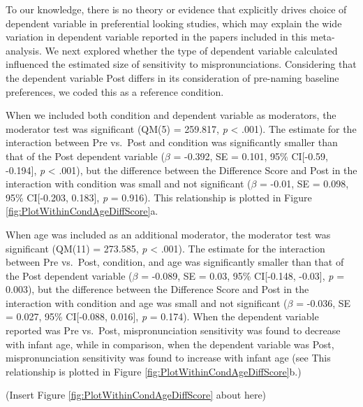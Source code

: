 \documentclass[man, noextraspace]{apa6}
\begin{document}
To our knowledge, there is no theory or evidence that explicitly drives choice of dependent variable in preferential looking studies, which may explain the wide variation in dependent variable reported in the papers included in this meta-analysis. We next explored whether the type of dependent variable calculated influenced the estimated size of sensitivity to mispronunciations. Considering that the dependent variable Post differs in its consideration of pre-naming baseline preferences, we coded this as a reference condition.

When we included both condition and dependent variable as moderators, the moderator test was significant (QM(5) = 259.817, \emph{p} \textless{} .001). The estimate for the interaction between Pre vs.~Post and condition was significantly smaller than that of the Post dependent variable (\(\beta\) = -0.392, SE = 0.101, 95\% CI{[}-0.59, -0.194{]}, \emph{p} \textless{} .001), but the difference between the Difference Score and Post in the interaction with condition was small and not significant (\(\beta\) = -0.01, SE = 0.098, 95\% CI{[}-0.203, 0.183{]}, \emph{p} = 0.916). This relationship is plotted in Figure \ref{fig:PlotWithinCondAgeDiffScore}a.

When age was included as an additional moderator, the moderator test was significant (QM(11) = 273.585, \emph{p} \textless{} .001). The estimate for the interaction between Pre vs.~Post, condition, and age was significantly smaller than that of the Post dependent variable (\(\beta\) = -0.089, SE = 0.03, 95\% CI{[}-0.148, -0.03{]}, \emph{p} = 0.003), but the difference between the Difference Score and Post in the interaction with condition and age was small and not significant (\(\beta\) = -0.036, SE = 0.027, 95\% CI{[}-0.088, 0.016{]}, \emph{p} = 0.174). When the dependent variable reported was Pre vs.~Post, mispronunciation sensitivity was found to decrease with infant age, while in comparison, when the dependent variable was Post, mispronunciation sensitivity was found to increase with infant age (see This relationship is plotted in Figure \ref{fig:PlotWithinCondAgeDiffScore}b.)

(Insert Figure \ref{fig:PlotWithinCondAgeDiffScore} about here)
\end{document}
